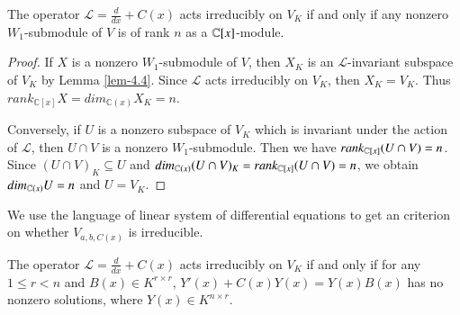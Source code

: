 \documentclass[12pt]{amsart}
\begin{document}
\begin{pro}\label{pro-4.1}
The operator $\mathcal{L}=\frac{d}{dx}+C(x)$ acts irreducibly on $V_K$ if and only if any nonzero $W_1$-submodule of $V$ is of rank $n$ as a $\mathbb{C}[x]$-module.
\end{pro}
\begin{proof}
If $X$ is a nonzero $W_1$-submodule of $V$, then $X_K$ is an $\mathcal{L}$-invariant subspace of $V_K$ by Lemma \ref{lem-4.4}.
Since $\mathcal{L}$ acts irreducibly on $V_K$, then $X_K=V_K$.
Thus $rank_{\mathbb{C}[x]}X=dim_{\mathbb{C}(x)}X_K=n$.

Conversely, if $U$ is a nonzero subspace of $V_K$ which is invariant under the action of $\mathcal{L}$, then $U\cap V$ is a nonzero
$W_1$-submodule. Then we have $rank_{\mathbb{C}[x]}(U\cap V)=n$.
Since $(U\cap V)_K\subseteq U$ and $dim_{\mathbb{C}(x)}(U\cap V)_K=rank_{\mathbb{C}[x]}(U\cap V)=n$, we obtain $dim_{\mathbb{C}(x)}U=n$ and $U=V_K$.
\end{proof}
We use the language of linear system of differential equations to get an criterion on whether $V_{a,b,C(x)}$ is irreducible.
\begin{pro}\label{pro-4.2-1}
The operator $\mathcal{L}=\frac{d}{dx}+C(x)$ acts irreducibly on $V_K$ if and only if for any $1\leq r<n$ and $B(x)\in K^{r\times r}$,
$Y'(x)+C(x)Y(x)=Y(x)B(x)$ has no nonzero solutions, where $Y(x)\in K^{n\times r}$.
\end{pro}
\end{document}
